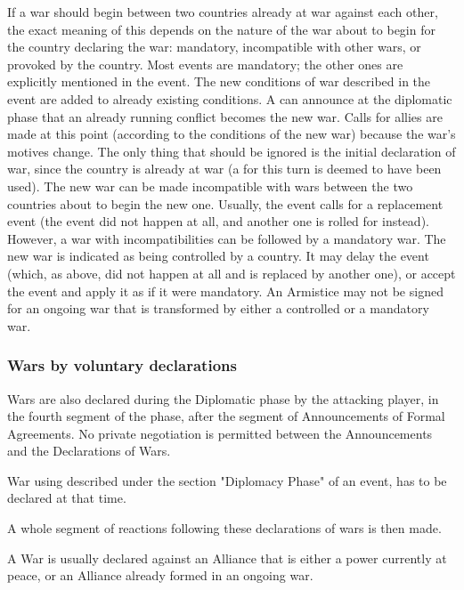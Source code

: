  If a war should begin between two
countries already at war against each other, the exact meaning of this depends
on the nature of the war about to begin for the country declaring the war:
mandatory, incompatible with other wars, or provoked by the country. Most
events are mandatory; the other ones are explicitly mentioned in the event.
 The new conditions of war described in the event are
added to already existing conditions. A \MAJ can announce at the diplomatic
phase that an already running conflict becomes the new war. Calls for allies
are made at this point (according to the conditions of the new war) because
the war's motives change. The only thing that should be ignored is the initial
declaration of war, since the country is already at war (a \CB for this turn
is deemed to have been used).
\bparag[Incompatibility] The new war can be made incompatible with wars
between the two countries about to begin the new one. Usually, the event calls
for a replacement event (the event did not happen at all, and another one is
rolled for instead). However, a war with incompatibilities can be followed by
a mandatory war.
 The new war is indicated as being controlled by a
country. It may delay the event (which, as above, did not happen at all and is
replaced by another one), or accept the event and apply it as if it were
mandatory.
\bparag[Armistices] An Armistice may not be signed for an ongoing war that is
transformed by either a controlled or a mandatory war.


\subsubsection{Wars by voluntary declarations}
\aparag Wars are also declared during the Diplomatic phase by the attacking
player, in the fourth segment of the phase, after the segment of Announcements
of Formal Agreements. No private negotiation is permitted between the
Announcements and the Declarations of Wars.

\aparag War using \CB described under the section "Diplomacy Phase" of an
event, has to be declared at that time.

\aparag A whole segment of reactions following these declarations of wars is
then made.

 A War is usually declared against an Alliance
that is either a power currently at peace, or an Alliance already formed in an
ongoing war.

